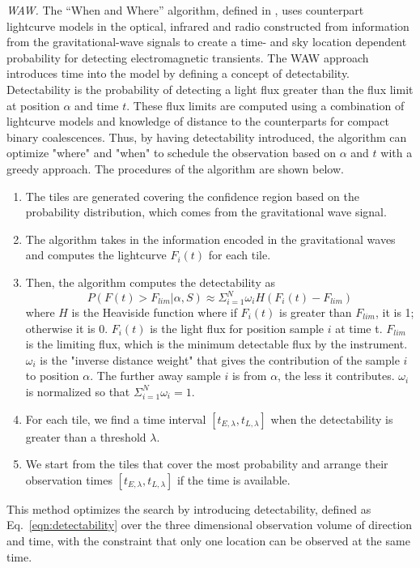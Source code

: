 \documentclass[twocolumn]{aastex62}
\begin{document}
\emph{WAW.} The ``When and Where'' algorithm, defined in \cite{SoCo2017}, uses counterpart lightcurve models in the optical, infrared and radio constructed from information from the gravitational-wave signals to create a time- and sky location dependent probability for detecting electromagnetic transients. The WAW approach introduces time into the model by defining a concept of detectability. Detectability is the probability of detecting a light flux greater than the flux limit at position $\alpha$ and time $t$. These flux limits are computed using a combination of lightcurve models and knowledge of distance to the counterparts for compact binary coalescences. Thus, by having detectability introduced, the algorithm can optimize "where" and "when" to schedule the observation based on $\alpha$ and $t$ with a greedy approach. The procedures of the algorithm are shown below.
\begin{enumerate}
\item The tiles are generated covering the confidence region based on the probability distribution, which comes from the gravitational wave signal.
\item The algorithm takes in the information encoded in the gravitational waves and computes the lightcurve $F_i(t)$ for each tile. 
\item Then, the algorithm computes the detectability as
\begin{equation}\label{eqn:detectability}
P(F(t) > F_{lim}|\alpha, S)\approx\Sigma_{i=1}^N\omega_i H(F_i(t)-F_{lim})
\end{equation}
where $H$ is the Heaviside function where if $F_i(t)$ is greater than $F_{lim}$, it is 1; otherwise it is 0. $F_i(t)$ is the light flux for position sample $i$ at time t. $F_{lim}$ is the limiting flux, which is the minimum detectable flux by the instrument. $\omega_i$ is the "inverse distance weight" that gives the contribution of the sample $i$ to position $\alpha$. The further away sample $i$ is from $\alpha$, the less it contributes. $\omega_i$ is normalized so that $\Sigma_{i=1}^N\omega_i=1$. 
\item For each tile, we find a time interval $[t_{E,\lambda},t_{L,\lambda}]$ when the detectability is greater than a threshold $\lambda$.
\item We start from the tiles that cover the most probability and arrange their observation times $[t_{E,\lambda},t_{L,\lambda}]$ if the time is available.
\end{enumerate}
This method optimizes the search by introducing detectability, defined as Eq.~\ref{eqn:detectability} over the three dimensional observation volume of direction and time, with the constraint that only one location can be observed at the same time.
\end{document}
